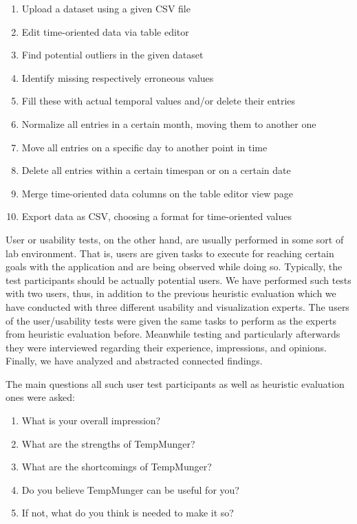 \begin{enumerate}
  \item Upload a dataset using a given \textsc{CSV} file
  \item Edit time-oriented data via table editor
  \item Find potential outliers in the given dataset
  \item Identify missing respectively erroneous values
  \item Fill these with actual temporal values and/or delete their entries
  \item Normalize all entries in a certain month, moving them to another one
  \item Move all entries on a specific day to another point in time
  \item Delete all entries within a certain timespan or on a certain date
  \item Merge time-oriented data columns on the table editor view page
  \item Export data as \textsc{CSV}, choosing a format for time-oriented values
\end{enumerate}

User or usability tests, on the other hand, are usually performed in some sort of lab environment.
That is, users are given tasks to execute for reaching certain goals with the application and are being observed while doing so.
Typically, the test participants should be actually potential users.
We have performed such tests with two users, thus, in addition to the previous heuristic evaluation which we have conducted with three different usability and visualization experts.
The users of the user/usability tests were given the same tasks to perform as the experts from heuristic evaluation before.
Meanwhile testing and particularly afterwards they were interviewed regarding their experience, impressions, and opinions.
Finally, we have analyzed and abstracted connected findings.

The main questions all such user test participants as well as heuristic evaluation ones were asked:

\begin{enumerate}
  \item What is your overall impression?
  \item What are the strengths of TempMunger?
  \item What are the shortcomings of TempMunger?
  \item Do you believe TempMunger can be useful for you?
  \item If not, what do you think is needed to make it so?
\end{enumerate}

